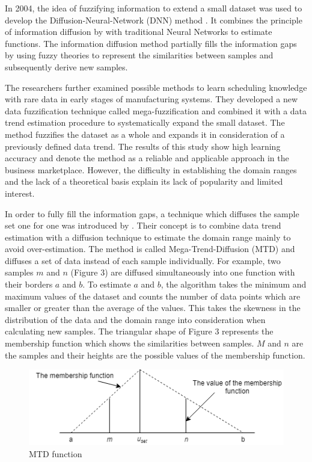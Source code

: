 \documentclass[parskip=full]{scrartcl}
\begin{document}
In 2004, the idea of fuzzifying information to extend a small dataset was used 
to develop the Diffusion-Neural-Network (DNN) method \cite{Huang.2004}. It 
combines the principle of information diffusion by \cite{Huang.1997} with 
traditional Neural Networks to estimate functions. The information diffusion 
method partially fills the information gaps by using fuzzy theories to 
represent the similarities between samples and subsequently derive new samples. 

The researchers \cite{Li.2006b} further examined possible methods to learn
scheduling knowledge with rare data in early stages of manufacturing systems.
They developed a new data fuzzification technique called mega-fuzzification and
combined it with a data trend estimation procedure to systematically expand the
small dataset. The method fuzzifies the dataset as a whole and expands it in
consideration of a previously defined data trend. The results of this study 
show high learning accuracy and denote the method as a reliable and applicable 
approach in the business marketplace. However, the difficulty in establishing 
the domain ranges and the lack of a theoretical basis explain its lack of 
popularity and limited interest. 

In order to fully fill the information gaps, a technique which diffuses the
sample set one for one was introduced by \cite{Li.2007}. Their concept is to 
combine data trend estimation with a diffusion technique to estimate the domain 
range mainly to avoid over-estimation. The method is called 
Mega-Trend-Diffusion (MTD) and diffuses a set of data instead of each sample
individually. For example, two samples $\mathit{m}$ and $\mathit{n}$ (Figure 3) 
are diffused simultaneously into one function with their borders $\mathit{a}$ 
and $\mathit{b}$. To estimate $\mathit{a}$ and $\mathit{b}$, the algorithm takes
the minimum and maximum values of the dataset and counts the number of data 
points which are smaller or greater than the average of the values. This takes 
the skewness in the distribution of the data and the domain range into 
consideration when calculating new samples. The triangular shape of Figure 3 
represents the membership function which shows the similarities between 
samples. $\mathit{M}$ and $\mathit{n}$ are the samples and their heights are 
the possible values of the membership function.

\begin{figure}[H]
	\centering
	\includegraphics[width=0.6\linewidth]{"./resources/mtd_function"}
	\caption{MTD function \cite{Li.2007}}
	\label{fig:mtd-function}
\end{figure}
\end{document}
